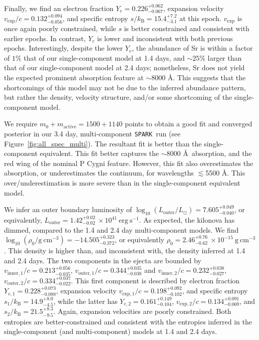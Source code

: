 \documentclass[twocolumn,twocolappendix]{aastex63}
\def\SPARK{\texttt{SPARK}}
\begin{document}
Finally, we find an electron fraction $Y_e = 0.226^{+0.062}_{-0.067}$, expansion velocity $v_{\mathrm{exp}}/c = 0.132^{+0.094}_{-0.056}$, and specific entropy $s/k_{\mathrm{B}} = 15.4^{+7.2}_{-3.1}$ at this epoch. $v_{\mathrm{exp}}$ is once again poorly constrained, while $s$ is better constrained and consistent with earlier epochs. In contrast, $Y_e$ is lower and inconsistent with both previous epochs. Interestingly, despite the lower $Y_e$, the abundance of Sr is within a factor of $1$\% that of our single-component model at 1.4 days, and $\sim 25$\% larger than that of our single-component model at 2.4 days; nonetheless, Sr does not yield the expected prominent absorption feature at $\sim$8000 \AA. This suggests that the shortcomings of this model may not be due to the inferred abundance pattern, but rather the density, velocity structure, and/or some shortcoming of the single-component model.

We require $m_0 + m_{\mathrm{active}} = 1500 + 1140$ points to obtain a good fit and converged posterior in our 3.4 day, multi-component \SPARK~run (see Figure~\ref{fig:all_spec_multi}). The resultant fit is better than the single-component equivalent. This fit better captures the $\sim$8000 \AA~absorption, and the red wing of the nominal P Cygni feature. However, this fit also overestimates the absorption, or underestimates the continuum, for wavelengths $\lesssim$5500 \AA. This over/underestimation is more severe than in the single-component equivalent model.  

We infer an outer boundary luminosity of $\log_{10} (L_{\mathrm{outer}}/L_{\odot}) = 7.605^{+0.049}_{-0.040}$, or equivalently, $L_{\mathrm{outer}} = 1.42^{+0.02}_{-0.02}~\times 10^{41}~\mathrm{erg~s^{-1}}$. As expected, the kilonova has dimmed, compared to the 1.4 and 2.4 day multi-component models. We find $\log_{10} (\rho_0 / \mathrm{g~cm^{-3}}) = -14.505^{+0.323}_{-0.372}$, or equivalently $\rho_0 = 2.46^{+0.76}_{-0.62}~\times 10^{-15}~\mathrm{g~cm^{-3}}$. This density is higher than, and inconsistent with, the density inferred at 1.4 and 2.4 days. The two components in the ejecta are bounded by $v_{\mathrm{inner,1}}/c = 0.213^{+0.056}_{-0.035}$, $v_{\mathrm{outer,1}}/c = 0.344^{+0.035}_{-0.038}$ and $v_{\mathrm{inner,2}}/c = 0.232^{+0.038}_{-0.027}$, $v_{\mathrm{outer,2}}/c = 0.334^{+0.037}_{-0.022}$. This first component is described by electron fraction $Y_{e,1} = 0.228^{+0.073}_{-0.088}$, expansion velocity $v_{\mathrm{exp},1}/c = 0.198^{+0.092}_{-0.102}$, and specific entropy $s_1 / k_{\mathrm{B}} = 14.9^{+8.0}_{-4.5}$, while the latter has $Y_{e,2} = 0.161^{+0.149}_{-0.104}$, $v_{\mathrm{exp},2}/c = 0.134^{+0.091}_{-0.069}$, and $s_2 / k_{\mathrm{B}} = 21.5^{+8.3}_{-9.5}$. Again, expansion velocities are poorly constrained. Both entropies are better-constrained and consistent with the entropies inferred in the single-component (and multi-component) models at 1.4 and 2.4 days.
\end{document}
